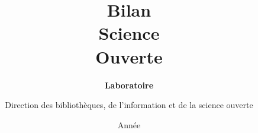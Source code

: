 \documentclass[french, 11pt]{dibiso/biso}
\title{Bilan \\ Science \\ Ouverte}
\author{Direction des bibliothèques, de l'information et de la science ouverte}
\date{Année \reportyear}
\subtitle{\textbf{Laboratoire \labacronym} \\
  \medskip
  \labfullname
}
\begin{document}
\maketitle


\nocite{*} %

{
  \footnotesize
  \printbibliography
}

\medskip

\worksbibtexinfo

\makelastpagebiblio
 
\end{document}
